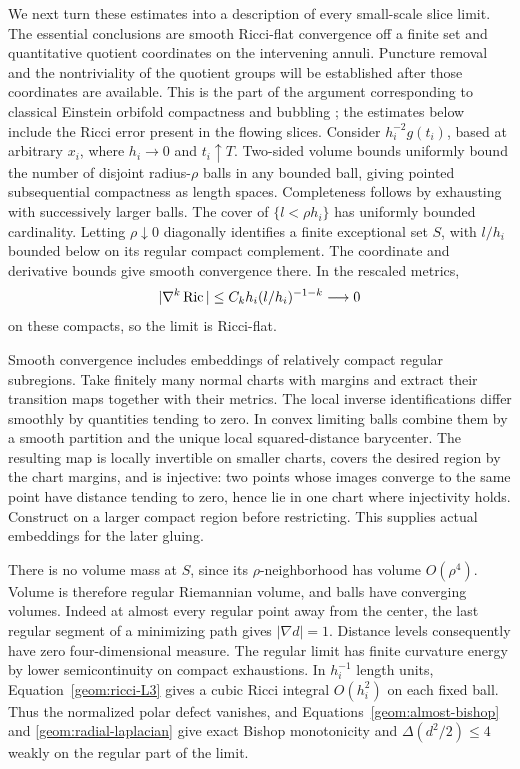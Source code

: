 We next turn these estimates into a description of every small-scale
slice limit. The essential conclusions are smooth Ricci-flat convergence
off a finite set and quantitative quotient coordinates on the intervening
annuli. Puncture removal and the nontriviality of the quotient groups
will be established after those coordinates are available.
This is the part of the argument corresponding to classical Einstein
orbifold compactness and bubbling \cite{Anderson1989,Bando1990,
BandoCorrection1990}; the estimates below include the Ricci error
present in the flowing slices.
Consider $h_i^{-2}g(t_i)$, based at arbitrary $x_i$, where
$h_i\to0$ and $t_i\uparrow T$. Two-sided volume bounds uniformly
bound the number of disjoint radius-$\rho$ balls in any bounded ball,
giving pointed subsequential compactness as length spaces.
Completeness follows by exhausting with successively larger balls.
The cover of $\{l<\rho h_i\}$ has uniformly bounded cardinality.
Letting $\rho\downarrow0$ diagonally identifies a finite exceptional
set $S$, with $l/h_i$ bounded below on its regular compact complement.
The coordinate and derivative bounds give smooth convergence there.
In the rescaled metrics,
\[
 |\nabla^k\operatorname{Ric}|\leq C_kh_i(l/h_i)^{-1-k}\longrightarrow0
\]
on these compacts, so the limit is Ricci-flat.

Smooth convergence includes embeddings of relatively compact regular
subregions. Take finitely many normal charts with margins and extract
their transition maps together with their metrics. The local inverse
identifications differ smoothly by quantities tending to zero.
In convex limiting balls combine them by a smooth partition and the
unique local squared-distance barycenter. The resulting map is locally
invertible on smaller charts, covers the desired region by the chart
margins, and is injective: two points whose images converge to the same
point have distance tending to zero, hence lie in one chart where
injectivity holds. Construct on a larger compact region before
restricting. This supplies actual embeddings for the later gluing.

There is no volume mass at $S$, since its $\rho$-neighborhood has volume
$O(\rho^4)$. Volume is therefore regular Riemannian volume, and balls
have converging volumes. Indeed at almost every regular point away
from the center, the last regular segment of a minimizing path gives
$|\nabla d|=1$. Distance levels consequently have zero four-dimensional
measure. The regular limit has finite curvature energy by lower
semicontinuity on compact exhaustions. In $h_i^{-1}$ length units,
Equation~\eqref{geom:ricci-L3} gives a cubic Ricci integral
$O(h_i^2)$ on each fixed ball. Thus the normalized polar defect
vanishes, and Equations~\eqref{geom:almost-bishop} and
\eqref{geom:radial-laplacian} give exact Bishop monotonicity and
$\Delta(d^2/2)\leq4$ weakly on the regular part of the limit.

